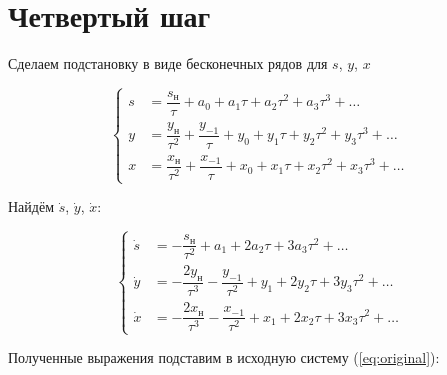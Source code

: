 \section{Четвертый шаг}

Сделаем подстановку в виде бесконечных рядов для $ s $, $ y $, $ x $ 

$$
	\left\{
		\begin{aligned}
			s &= \dfrac{s_{\text{н}}}{\tau} + a_0 + a_1\tau + a_2\tau^2 + a_3\tau^3 + \ldots \\
			y &= \dfrac{y_{\text{н}}}{\tau^2} + \dfrac{y_{-1}}{\tau} + y_0 + y_1\tau + y_2\tau^2 + y_3\tau^3 + \ldots \\
			x &= \dfrac{x_{\text{н}}}{\tau^2} + \dfrac{x_{-1}}{\tau} + x_0 + x_1\tau + x_2\tau^2 + x_3\tau^3 + \ldots
		\end{aligned}
	\right.
$$

Найдём $ \dot s $, $ \dot y $, $ \dot x $:

$$
	\left\{
		\begin{aligned}
			\dot s &= -\dfrac{s_{\text{н}}}{\tau^{2}} + a_1 + 2a_2\tau + 3a_3\tau^2 + \ldots \\
			\dot y &= -\dfrac{2y_{\text{н}}}{\tau^{3}} - \dfrac{y_{-1}}{\tau^2} + y_1 + 2y_2\tau + 3y_3\tau^2 + \ldots \\
			\dot x &= -\dfrac{2x_{\text{н}}}{\tau^{3}} - \dfrac{x_{-1}}{\tau^2} + x_1 + 2x_2\tau + 3x_3\tau^2 + \ldots
		\end{aligned}
	\right.
$$

\newpage

Полученные выражения подставим в исходную систему (\ref{eq:original}):

